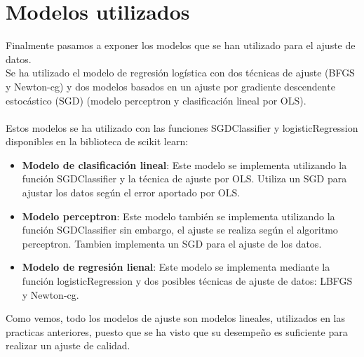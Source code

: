 \section{Modelos utilizados}
Finalmente pasamos a exponer los modelos que se han utilizado para el ajuste de datos.
\\Se ha utilizado el modelo de regresión logística con dos técnicas de ajuste (BFGS y Newton-cg) y dos modelos basados en un ajuste por gradiente descendente estocástico (SGD) (modelo perceptron y clasificación lineal por OLS).
\\\\
Estos modelos se ha utilizado con las funciones SGDClassifier\cite{SGDClassifier} y  logisticRegression\cite{logisticRegression} disponibles en la biblioteca de scikit learn:
\begin{itemize}
   \item \textbf{Modelo de clasificación lineal}: Este modelo se implementa utilizando la función SGDClassifier y la técnica de ajuste por OLS. Utiliza un SGD para ajustar los datos según el error aportado por OLS.
   \item \textbf{Modelo perceptron}: Este modelo también se implementa utilizando la función SGDClassifier sin embargo, el ajuste se realiza según el algoritmo perceptron. Tambien implementa un SGD para el ajuste de los datos.
   \item \textbf{Modelo de regresión lienal}: Este modelo se implementa mediante la función logisticRegression y dos posibles técnicas de ajuste de datos: LBFGS y Newton-cg.
\end{itemize}
Como vemos, todo los modelos de ajuste son modelos lineales, utilizados en las practicas anteriores, puesto que se ha visto que su desempeño es suficiente para realizar un ajuste de calidad.

